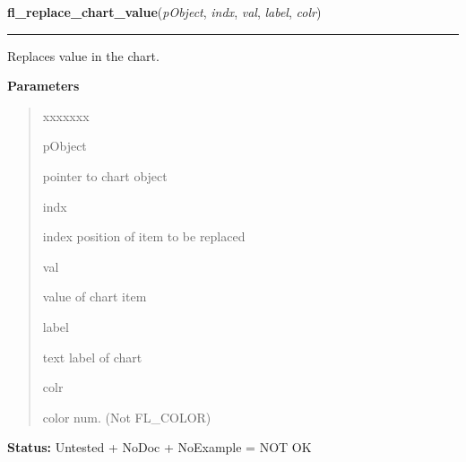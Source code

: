 \hspace{.8\funcindent}\begin{boxedminipage}{\funcwidth}

    \raggedright \textbf{fl\_replace\_chart\_value}(\textit{pObject}, \textit{indx}, \textit{val}, \textit{label}, \textit{colr})

    \vspace{-1.5ex}

    \rule{\textwidth}{0.5\fboxrule}
\setlength{\parskip}{2ex}
    Replaces value in the chart.

\setlength{\parskip}{1ex}
      \textbf{Parameters}
      \vspace{-1ex}

      \begin{quote}
        \begin{Ventry}{xxxxxxx}

          \item[pObject]

          pointer to chart object

          \item[indx]

          index position of item to be replaced

          \item[val]

          value of chart item

          \item[label]

          text label of chart

          \item[colr]

          color num. (Not FL\_COLOR)

        \end{Ventry}

      \end{quote}

\textbf{Status:} Untested + NoDoc + NoExample = NOT OK



    \end{boxedminipage}

    \label{xformslib:library:fl_set_chart_bounds}

    \vspace{0.5ex}

